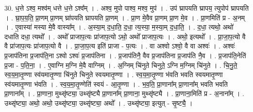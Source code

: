 \documentclass[17pt]{extarticle}
\begin{document}
30. ध॒त्ते ऽश्व॒ मश्व॑म् धत्ते ध॒त्ते ऽश्व᳚म् । . अश्व॒ मुपो पाश्व॒ मश्व॒ मुप॑ । . उप॑ घ्रापयति घ्रापय॒ त्युपोप॑ घ्रापयति । . घ्रा॒प॒य॒ति॒ प्रा॒णम् प्रा॒णम् घ्रा॑पयति घ्रापयति प्रा॒णम् । . प्रा॒ण मे॒वैव प्रा॒णम् प्रा॒ण मे॒व । . प्रा॒णमिति॑ प्र - अ॒नम् । . ए॒वास्या॑ मस्या मे॒वै वास्या᳚म् । . अ॒स्या॒म् द॒धा॒ति॒ द॒धा॒ त्य॒स्या॒ म॒स्या॒म् द॒धा॒ति॒ । . द॒धा॒ त्यथो॒ अथो॑ दधाति दधा॒ त्यथो᳚ । . अथो᳚ प्राजाप॒त्यः प्रा॑जाप॒त्यो ऽथो॒ अथो᳚ प्राजाप॒त्यः । . अथो॒ इत्यथो᳚ । . प्रा॒जा॒प॒त्यो वै वै प्रा॑जाप॒त्यः प्रा॑जाप॒त्यो वै । . प्रा॒जा॒प॒त्य इति॑ प्राजा - प॒त्यः । . वा अश्वो ऽश्वो॒ वै वा अश्वः॑ । . अश्वः॑ प्र॒जाप॑तिना प्र॒जाप॑ति॒ना ऽश्वो ऽश्वः॑ प्र॒जाप॑तिना । . प्र॒जाप॑तिनै॒ वैव प्र॒जाप॑तिना प्र॒जाप॑ति नै॒व । . प्र॒जाप॑ति॒नेति॑ प्र॒जा - प॒ति॒ना॒ । . ए॒वाग्नि म॒ग्नि मे॒वै वाग्निम् । . अ॒ग्निम् चि॑नुते चिनुते॒ ऽग्नि म॒ग्निम् चि॑नुते । . चि॒नु॒ते॒ स्व॒य॒मा॒तृ॒ण्णा स्व॑यमातृ॒ण्णा चि॑नुते चिनुते स्वयमातृ॒ण्णा । . स्व॒य॒मा॒तृ॒ण्णा भ॑वति भवति स्वयमातृ॒ण्णा स्व॑यमातृ॒ण्णा भ॑वति । . स्व॒य॒मा॒तृ॒ण्णेति॑ स्वयं - आ॒तृ॒ण्णा । . भ॒व॒ति॒ प्रा॒णाना᳚म् प्रा॒णाना᳚म् भवति भवति प्रा॒णाना᳚म् । . प्रा॒णाना॒ मुथ्सृ॑ष्ट्या॒ उथ्सृ॑ष्ट्यै प्रा॒णाना᳚म् प्रा॒णाना॒ मुथ्सृ॑ष्ट्यै । . प्रा॒णाना॒मिति॑ प्र - अ॒नाना᳚म् । . उथ्सृ॑ष्ट्या॒ अथो॒ अथो॒ उथ्सृ॑ष्ट्या॒ उथ्सृ॑ष्ट्या॒ अथो᳚ । . उथ्सृ॑ष्ट्या॒ इत्युत् - सृ॒ष्ट्यै॒ । \newline
\end{document}
